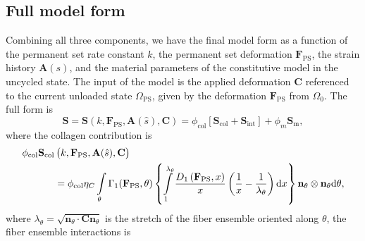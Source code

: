 \subsection{Full model form}
	Combining all three components, we have the final model form as a function of the permanent set rate constant $k $, the permanent set deformation $\mathbf{F}_\mathrm{PS}$, the strain history $\mathbf{A}(s)$, and the material parameters of the constitutive model in the uncycled state. The input of the model is the applied deformation $\mathbf{C}$ referenced to the current unloaded state $\Omega_\mathrm{PS}$, given by the deformation $\mathbf{F}_\mathrm{PS}$ from $\Omega_0$. The full form is
\begin{equation}\label{eq:fullEXLmodel}
\mathbf{S} = \mathbf{S}\left(k , \mathbf{F}_\mathrm{PS}, \mathbf{A}(\hat{s}), \mathbf{C}\right) = \phi_\mathrm{col} \left[ \mathbf{S}_\mathrm{col} + \mathbf{S}_\mathrm{int}\right] + \phi_m \mathbf{S}_\mathrm{m},
\end{equation}
where the collagen contribution is 
\begin{equation} \label{eq:fullcollagen}
\begin{split}
\phi_\mathrm{col}\mathbf{S}_\mathrm{col}&\left(k , \mathbf{F}_\mathrm{PS}, \mathbf{A}(\hat{s}), \mathbf{C}\right) \\
&= \phi_\mathrm{col} \eta_C \int\displaylimits_\theta \Gamma_1(\mathbf{F}_{\mathrm{PS}}, \theta)\left\lbrace 
\int\displaylimits_1^{\lambda_\theta} \frac{D_1\left( \mathbf{F}_{\mathrm{PS}}, x \right)}{x} \left( \frac{1}{x}- \frac{1}{\lambda_\theta}\right) \mathrm{d}x \right\rbrace \mathbf{n}_\theta\otimes\mathbf{n}_\theta \mathrm{d}\theta,
\end{split}
\end{equation}
where $\lambda_\theta = \sqrt{\mathbf{n}_\theta \cdot \mathbf{C}\mathbf{n}_\theta}$ is the stretch of the fiber ensemble oriented along $\theta$, the fiber ensemble interactions is 
